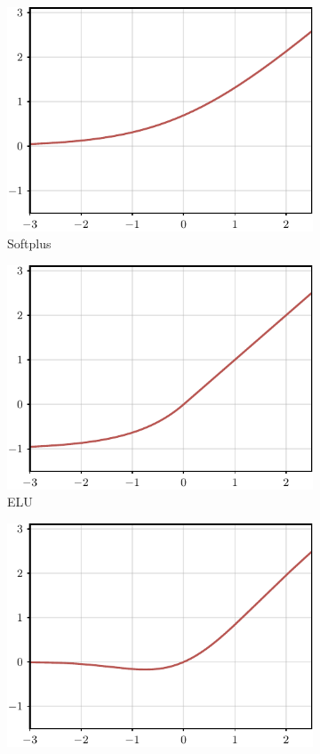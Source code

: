 \begin{figure}[t]
\begin{subfigure}[b]{0.18\textwidth}
    \includegraphics[width=1.0\textwidth]{images/activation_function_Softplus.pdf}
    \caption{Softplus}
    \end{subfigure}
    \hfill
    \begin{subfigure}[b]{0.18\textwidth}
    \includegraphics[width=1.0\textwidth]{images/activation_function_ELU.pdf}
    \caption{ELU}
    \end{subfigure}
    \hfill
    \begin{subfigure}[b]{0.18\textwidth}
    \includegraphics[width=1.0\textwidth]{images/activation_function_GELU.pdf}

\end{subfigure}
\end{figure}
